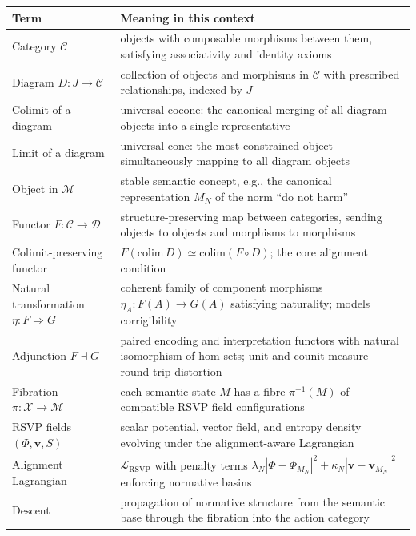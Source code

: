 \documentclass[12pt]{article}
\theoremstyle{definition}
\begin{document}
\vspace{0.5em}
\noindent\begin{tabular}{@{}p{}p{}@{}}
\toprule
Term & Meaning in this context \\
\midrule
Category $\mathcal{C}$ & objects with composable morphisms between them,
  satisfying associativity and identity axioms \\[3pt]
Diagram $D : J \to \mathcal{C}$ & collection of objects and morphisms in
  $\mathcal{C}$ with prescribed relationships, indexed by $J$ \\[3pt]
Colimit of a diagram & universal cocone: the canonical merging of all
  diagram objects into a single representative \\[3pt]
Limit of a diagram & universal cone: the most constrained object
  simultaneously mapping to all diagram objects \\[3pt]
Object in $\mathcal{M}$ & stable semantic concept, e.g., the canonical
  representation $M_N$ of the norm ``do not harm'' \\[3pt]
Functor $F:\mathcal{C}\to\mathcal{D}$ & structure-preserving map between
  categories, sending objects to objects and morphisms to morphisms \\[3pt]
Colimit-preserving functor & $F(\mathrm{colim}\,D)\simeq\mathrm{colim}
  (F\circ D)$; the core alignment condition \\[3pt]
Natural transformation $\eta : F \Rightarrow G$ & coherent family of
  component morphisms $\eta_A : F(A) \to G(A)$ satisfying naturality;
  models corrigibility \\[3pt]
Adjunction $F \dashv G$ & paired encoding and interpretation functors with
  natural isomorphism of hom-sets; unit and counit measure round-trip
  distortion \\[3pt]
Fibration $\pi:\mathcal{X}\to\mathcal{M}$ & each semantic state $M$ has a
  fibre $\pi^{-1}(M)$ of compatible RSVP field configurations \\[3pt]
RSVP fields $(\Phi, \mathbf{v}, S)$ & scalar potential, vector field, and
  entropy density evolving under the alignment-aware Lagrangian \\[3pt]
Alignment Lagrangian & $\mathcal{L}_{\mathrm{RSVP}}$ with penalty terms
  $\lambda_N|\Phi - \Phi_{M_N}|^2 + \kappa_N|\mathbf{v} - \mathbf{v}_{M_N}|^2$
  enforcing normative basins \\[3pt]
Descent & propagation of normative structure from the semantic base through
  the fibration into the action category \\[3pt]

\end{tabular}
\end{document}
